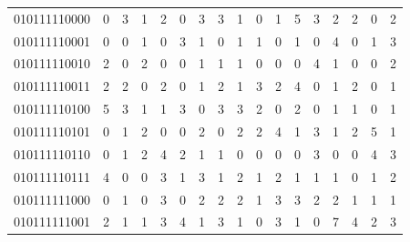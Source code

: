 \documentclass[10pt,a4paper]{article}
\begin{document}
\begin{longtable}{ |c|c|c|c|c|c|c|c|c|c|c|c|c|c|c|c|c| }
    010111110000              & 0                            & 3                                & 1                            & 2                              & 0   & 3   & 3   & 1   & 0   & 1   & 5   & 3   & 2   & 2   & 0   & 2   \\
    010111110001              & 0                            & 0                                & 1                            & 0                              & 3   & 1   & 0   & 1   & 1   & 0   & 1   & 0   & 4   & 0   & 1   & 3   \\
    010111110010              & 2                            & 0                                & 2                            & 0                              & 0   & 1   & 1   & 1   & 0   & 0   & 0   & 4   & 1   & 0   & 0   & 2   \\
    010111110011              & 2                            & 2                                & 0                            & 2                              & 0   & 1   & 2   & 1   & 3   & 2   & 4   & 0   & 1   & 2   & 0   & 1   \\
    010111110100              & 5                            & 3                                & 1                            & 1                              & 3   & 0   & 3   & 3   & 2   & 0   & 2   & 0   & 1   & 1   & 0   & 1   \\
    010111110101              & 0                            & 1                                & 2                            & 0                              & 0   & 2   & 0   & 2   & 2   & 4   & 1   & 3   & 1   & 2   & 5   & 1   \\
    010111110110              & 0                            & 1                                & 2                            & 4                              & 2   & 1   & 1   & 0   & 0   & 0   & 0   & 3   & 0   & 0   & 4   & 3   \\
    010111110111              & 4                            & 0                                & 0                            & 3                              & 1   & 3   & 1   & 2   & 1   & 2   & 1   & 1   & 1   & 0   & 1   & 2   \\
    010111111000              & 0                            & 1                                & 0                            & 3                              & 0   & 2   & 2   & 2   & 1   & 3   & 3   & 2   & 2   & 1   & 1   & 1   \\
    010111111001              & 2                            & 1                                & 1                            & 3                              & 4   & 1   & 3   & 1   & 0   & 3   & 1   & 0   & 7   & 4   & 2   & 3   \\

\end{longtable}
\end{document}

